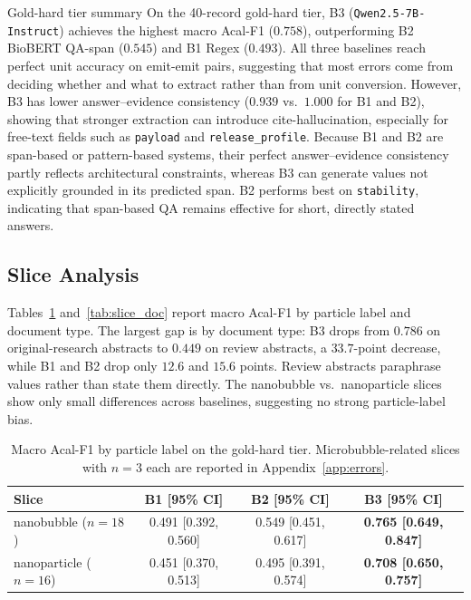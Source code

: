 \documentclass{article}
\begin{document}
\begin{findingbox}{Gold-hard tier summary}
On the 40-record gold-hard tier, B3 (\texttt{Qwen2.5-7B-Instruct})
achieves the highest macro Acal-F1 ($0.758$), outperforming B2
BioBERT QA-span ($0.545$) and B1 Regex ($0.493$). All three baselines
reach perfect unit accuracy on emit-emit pairs, suggesting that most
errors come from deciding whether and what to extract rather than from
unit conversion. However, B3 has lower answer--evidence consistency
($0.939$ vs.\ $1.000$ for B1 and B2), showing that stronger extraction
can introduce cite-hallucination, especially for free-text fields such
as \texttt{payload} and \texttt{release\_profile}. Because B1 and B2
are span-based or pattern-based systems, their perfect answer--evidence
consistency partly reflects architectural constraints, whereas B3 can
generate values not explicitly grounded in its predicted span. B2
performs best on \texttt{stability}, indicating that span-based QA
remains effective for short, directly stated answers.
\end{findingbox}

\subsection{Slice Analysis}
\label{sec:slices}

Tables~\ref{tab:slice_nb} and~\ref{tab:slice_doc} report macro Acal-F1 by particle label and document type. The largest gap is by document type: B3 drops from $0.786$ on original-research abstracts to $0.449$ on review abstracts, a $33.7$-point decrease, while B1 and B2 drop only $12.6$ and $15.6$ points. Review abstracts paraphrase values rather than state them directly. The nanobubble vs.\ nanoparticle slices show only small differences across baselines, suggesting no strong particle-label bias.


\begin{table}[t]
\centering
\caption{Macro Acal-F1 by particle label on the gold-hard tier. Microbubble-related slices with $n=3$ each are reported in Appendix~\ref{app:errors}.}
\label{tab:slice_nb}
\small
\setlength{\tabcolsep}{4pt}
\begin{tabular}{@{}lccc@{}}
\toprule
\textbf{Slice} & \textbf{B1 [95\% CI]} & \textbf{B2 [95\% CI]} & \textbf{B3 [95\% CI]} \\
\midrule
nanobubble ($n=18$)   & 0.491 [0.392, 0.560] & 0.549 [0.451, 0.617] & \textbf{0.765 [0.649, 0.847]} \\
nanoparticle ($n=16$) & 0.451 [0.370, 0.513] & 0.495 [0.391, 0.574] & \textbf{0.708 [0.650, 0.757]} \\
\bottomrule
\end{tabular}
\end{table}
\end{document}
